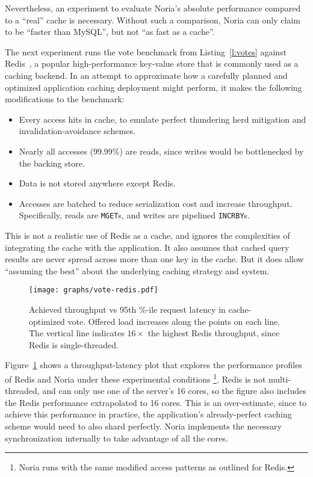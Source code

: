 Nevertheless, an experiment to evaluate Noria's absolute performance compared to
a ``real'' cache is necessary. Without such a comparison, Noria can only claim
to be ``faster than MySQL'', but not ``as fast as a cache''.

The next experiment runs the vote benchmark from Listing~\ref{l:votes} against
Redis~\cite{redis}, a popular high-performance key-value store that is commonly
used as a caching backend. In an attempt to approximate how a carefully planned
and optimized application caching deployment might perform, it makes the
following modifications to the benchmark:

\begin{itemize}
 \item Every access hits in cache, to emulate perfect thundering herd mitigation
   and invalidation-avoidance schemes.
 \item Nearly all accesses (99.99\%) are reads, since writes would be
   bottlenecked by the backing store.
 \item Data is not stored anywhere except Redis.
 \item Accesses are batched to reduce serialization cost and increase
   throughput. Specifically, reads are \texttt{MGET}s, and writes are pipelined
    \texttt{INCRBY}s.
\end{itemize}

This is not a realistic use of Redis as a cache, and ignores the complexities of
integrating the cache with the application. It also assumes that cached query
results are never spread across more than one key in the cache. But it does
allow ``assuming the best'' about the underlying caching strategy and system.

\begin{figure}[h]
  \centering
  \texttt{[image: graphs/vote-redis.pdf]}
  \caption{Achieved throughput vs 95th \%-ile request latency in cache-optimized
  vote. Offered load increases along the points on each line. The vertical
  line indicates $16\times$ the highest Redis throughput, since Redis is
  single-threaded.}
  \label{f:vote-redis}
\end{figure}

Figure~\ref{f:vote-redis} shows a throughput-latency plot that explores the
performance profiles of Redis and Noria under these experimental conditions%
\footnote{Noria runs with the same modified access patterns as outlined for
Redis.}.
Redis is not multi-threaded, and can only use one of the server's 16 cores, so
the figure also includes the Redis performance extrapolated to 16 cores. This is
an over-estimate, since to achieve this performance in practice, the
application's already-perfect caching scheme would need to also shard perfectly.
Noria implements the necessary synchronization internally to take advantage of
all the cores.

